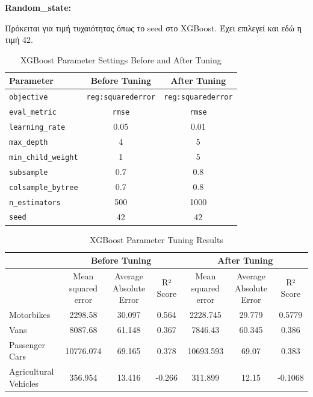 \documentclass{llncs}
\begin{document}
\noindent \textbf{Random\_state:}

Πρόκειται για τιμή τυχαιότητας όπως το seed στο XGBoost. Έχει επιλεγεί και εδώ η τιμή 42.

\begin{table}[ht]
    \centering
    \begin{tabular}{l|cc}
        \hline
        Parameter & Before Tuning & After Tuning \\
        \hline
        \texttt{objective} & \texttt{reg:squarederror} & \texttt{reg:squarederror} \\
        \texttt{eval\_metric} & \texttt{rmse} & \texttt{rmse} \\
        \texttt{learning\_rate} & 0.05 & 0.01 \\
        \texttt{max\_depth} & 4 & 5 \\
        \texttt{min\_child\_weight} & 1 & 5 \\
        \texttt{subsample} & 0.7 & 0.8 \\
        \texttt{colsample\_bytree} & 0.7 & 0.8 \\
        \texttt{n\_estimators} & 500 & 1000 \\
        \texttt{seed} & 42 & 42 \\
        \hline
    \end{tabular}
    \caption{XGBoost Parameter Settings Before and After Tuning}
\end{table}

\begin{table}[ht]
    \centering
    \begin{tabular}{lccc|ccc}
        \hline
        & \multicolumn{3}{c}{Before Tuning} & \multicolumn{3}{c}{After Tuning} \\
        \hline
        & Mean squared error & Average Absolute Error & R² Score & Mean squared error & Average Absolute Error & R² Score \\
        \hline
        Motorbikes & 2298.58 & 30.097 & 0.564 & 2228.745 & 29.779 & 0.5779 \\
        Vans & 8087.68 & 61.148 & 0.367 & 7846.43 & 60.345 & 0.386 \\
        Passenger Cars & 10776.074 & 69.165 & 0.378 & 10693.593 & 69.07 & 0.383 \\
        Agricultural Vehicles & 356.954 & 13.416 & -0.266 & 311.899 & 12.15 & -0.1068 \\
        \hline
    \end{tabular}
    \caption{XGBoost Parameter Tuning Results}
\end{table}
\end{document}
